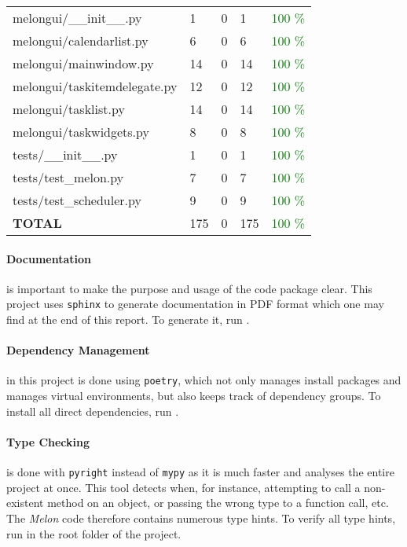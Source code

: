 \begin{table}
\begin{tabular}{lllll}
    melongui/\_\_init\_\_.py        & 1         & 0        & 1         & \textcolor{green}{100 \%} \\
    melongui/calendarlist.py        & 6         & 0        & 6         & \textcolor{green}{100 \%} \\
    melongui/mainwindow.py          & 14        & 0        & 14        & \textcolor{green}{100 \%} \\
    melongui/taskitemdelegate.py    & 12        & 0        & 12        & \textcolor{green}{100 \%} \\
    melongui/tasklist.py            & 14        & 0        & 14        & \textcolor{green}{100 \%} \\
    melongui/taskwidgets.py         & 8         & 0        & 8         & \textcolor{green}{100 \%} \\
    tests/\_\_init\_\_.py           & 1         & 0        & 1         & \textcolor{green}{100 \%} \\
    tests/test\_melon.py            & 7         & 0        & 7         & \textcolor{green}{100 \%} \\
    tests/test\_scheduler.py        & 9         & 0        & 9         & \textcolor{green}{100 \%} \\
    \hline
    \bf TOTAL                       & 175       & 0        & 175       & \textcolor{green}{100 \%} \\
    \hline
  \end{tabular}
  \label{table:interrogate}
\end{table}

\paragraph{Documentation} is important to make the purpose and usage of the code package clear. This project uses \texttt{sphinx} to generate documentation in PDF format which one may find at the end of this report. To generate it, run .

\paragraph{Dependency Management} in this project is done using \texttt{poetry}, which not only manages install packages and manages virtual environments, but also keeps track of dependency groups.
To install all direct dependencies, run .

\paragraph{Type Checking} is done with \texttt{pyright} instead of \texttt{mypy} as it is much faster and analyses the entire project at once. This tool detects when, for instance, attempting to call a non-existent method on an object, or passing the wrong type to a function call, etc.
The \textit{Melon} code therefore contains numerous type hints.
To verify all type hints, run  in the root folder of the project.

